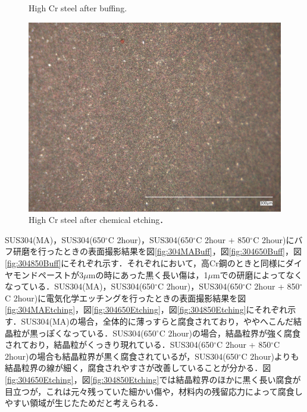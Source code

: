 \begin{figure}[htbp]
\begin{minipage}[htbp]{0.45\linewidth}
      \label{fig:Cr1um}
    \end{minipage}
    \centering
    \caption{High Cr steel after buffing.}
    \label{fig:CrBuff}
\end{figure} 
\begin{figure}[htbp]
    \centering %
    \includegraphics[width=100truemm,clip]{fig/241218_9Cr_etching.jpg}
    \caption{High Cr steel after chemical etching．}
    \label{fig:CrEtching}
\end{figure}
SUS304(MA)，SUS304(650$^\circ$C 2hour)，SUS304(650$^\circ$C 2hour + 850$^\circ$C 2hour)にバフ研磨を行ったときの表面撮影結果を図\ref{fig:304MABuff}，図\ref{fig:304650Buff}，図\ref{fig:304850Buff}にそれぞれ示す．それぞれにおいて，高Cr鋼のときと同様にダイヤモンドペーストが3$\mu$mの時にあった黒く長い傷は，1$\mu$mでの研磨によってなくなっている．SUS304(MA)，SUS304(650$^\circ$C 2hour)，SUS304(650$^\circ$C 2hour + 850$^\circ$C 2hour)に電気化学エッチングを行ったときの表面撮影結果を図\ref{fig:304MAEtching}，図\ref{fig:304650Etching}，図\ref{fig:304850Etching}にそれぞれ示す．SUS304(MA)の場合，全体的に薄っすらと腐食されており，ややへこんだ結晶粒が黒っぽくなっている．SUS304(650$^\circ$C 2hour)の場合，結晶粒界が強く腐食されており，結晶粒がくっきり現れている．SUS304(650$^\circ$C 2hour + 850$^\circ$C 2hour)の場合も結晶粒界が黒く腐食されているが，SUS304(650$^\circ$C 2hour)よりも結晶粒界の線が細く，腐食されやすさが改善していることが分かる．図\ref{fig:304650Etching}，図\ref{fig:304850Etching}では結晶粒界のほかに黒く長い腐食が目立つが，これは元々残っていた細かい傷や，材料内の残留応力によって腐食しやすい領域が生じたためだと考えられる．
